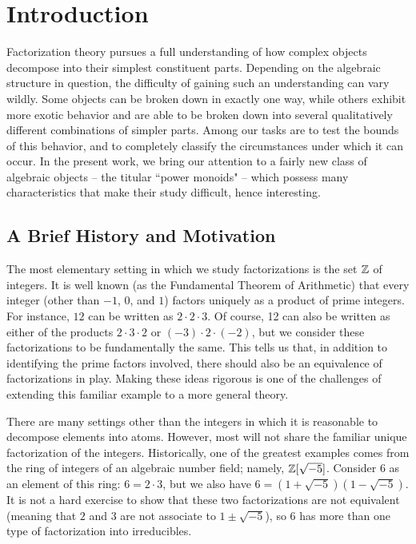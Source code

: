 \chapter{Introduction} \label{ch:intro}

Factorization theory pursues a full understanding of how complex objects decompose into their simplest constituent parts.  
Depending on the algebraic structure in question, the difficulty of gaining such an understanding can vary wildly. 
Some objects can be broken down in exactly one way, while others exhibit more exotic behavior and are able to be broken down into several qualitatively different combinations of simpler parts.
Among our tasks are to test the bounds of this behavior, and to completely classify the circumstances under which it can occur.
In the present work, we bring our attention to a fairly new class of algebraic objects -- the titular ``power monoids" --  which possess many characteristics that make their study difficult, hence interesting.

\section{A Brief History and Motivation}

The most elementary setting in which we study factorizations is the set $\mathbb{Z}$ of integers.
It is well known (as the Fundamental Theorem of Arithmetic) that every integer (other than $-1$, $0$, and $1$) factors uniquely as a product of prime integers.
For instance, $12$ can be written as $2\cdot 2\cdot 3$.
Of course, 12 can also be written as either of the products $2\cdot 3\cdot 2$ or $(-3)\cdot 2\cdot (-2)$, but we consider these factorizations to be fundamentally the same.  
This tells us that, in addition to identifying the prime factors involved, there should also be an equivalence of factorizations in play.
Making these ideas rigorous is one of the challenges of extending this familiar example to a more general theory.


There are many settings other than the integers in which it is reasonable to decompose elements into atoms. 
However, most will not share the familiar unique factorization of the integers.  
Historically, one of the greatest examples comes from the ring of integers of an algebraic number field; namely, $\mathbb{Z}[\sqrt{-5}]$.
Consider $6$ as an element of this ring: $6=2\cdot3$, but we also have $6 = (1+\sqrt{-5})(1-\sqrt{-5})$.
It is not a hard exercise to show that these two factorizations are not equivalent (meaning that $2$ and $3$ are not associate to $1\pm\sqrt{-5}$), so $6$ has more than one type of factorization into irreducibles.

